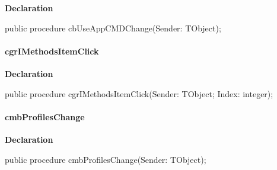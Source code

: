 \documentclass{report}
\newif\ifpdf
\begin{document}
\label{prjwizard.TfrmProjectWizard-cbUseAppCMDChange}
\begin{list}{}{
\setlength{\itemindent}{0cm}
\setlength{\listparindent}{0cm}
\setlength{\leftmargin}{\evensidemargin}
\addtolength{\leftmargin}{\tmplength}
\settowidth{\labelsep}{X}
\addtolength{\leftmargin}{\labelsep}
\setlength{\labelwidth}{\tmplength}
}
\item[\textbf{Declaration}\hfill]
\ifpdf
\begin{flushleft}
\fi
\begin{ttfamily}
public procedure cbUseAppCMDChange(Sender: TObject);\end{ttfamily}

\ifpdf
\end{flushleft}
\fi

\end{list}
\paragraph*{cgrIMethodsItemClick}\hspace*{\fill}

\label{prjwizard.TfrmProjectWizard-cgrIMethodsItemClick}
\begin{list}{}{
\setlength{\itemindent}{0cm}
\setlength{\listparindent}{0cm}
\setlength{\leftmargin}{\evensidemargin}
\addtolength{\leftmargin}{\tmplength}
\settowidth{\labelsep}{X}
\addtolength{\leftmargin}{\labelsep}
\setlength{\labelwidth}{\tmplength}
}
\item[\textbf{Declaration}\hfill]
\ifpdf
\begin{flushleft}
\fi
\begin{ttfamily}
public procedure cgrIMethodsItemClick(Sender: TObject; Index: integer);\end{ttfamily}

\ifpdf
\end{flushleft}
\fi

\end{list}
\paragraph*{cmbProfilesChange}\hspace*{\fill}

\label{prjwizard.TfrmProjectWizard-cmbProfilesChange}
\begin{list}{}{
\setlength{\itemindent}{0cm}
\setlength{\listparindent}{0cm}
\setlength{\leftmargin}{\evensidemargin}
\addtolength{\leftmargin}{\tmplength}
\settowidth{\labelsep}{X}
\addtolength{\leftmargin}{\labelsep}
\setlength{\labelwidth}{\tmplength}
}
\item[\textbf{Declaration}\hfill]
\ifpdf
\begin{flushleft}
\fi
\begin{ttfamily}
public procedure cmbProfilesChange(Sender: TObject);\end{ttfamily}

\ifpdf
\end{flushleft}
\fi

\end{list}
\end{document}
